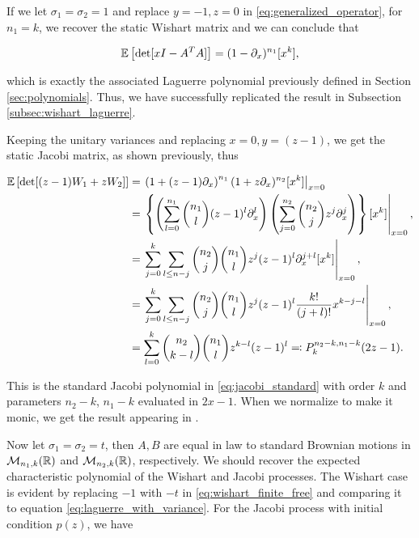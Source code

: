     If we let $\sigma_1 = \sigma_2 = 1$ and replace $y=-1, z=0$ in \eqref{eq:generalized_operator}, for $n_1 = k$, we recover the static Wishart matrix and we can conclude that

    \begin{equation} \label{eq:wishart_finite_free}
        \mathbb E \left[ \det[xI - A^TA] \right] = (1 - \partial_x)^{n_1}[x^k],
    \end{equation}

    \noindent which is exactly the associated Laguerre polynomial previously defined in Section \ref{sec:polynomials}. Thus, we have successfully replicated the result in Subsection \ref{subsec:wishart_laguerre}.

    Keeping the unitary variances and replacing $x=0, y=(z-1)$, we get the static Jacobi matrix, as shown previously, thus 

    \begin{align*}
        \mathbb E \left[ \det[(z-1)W_1 + zW_2] \right] &= \left.\left(1 + (z-1)\partial_x\right)^{n_1}(1+z\partial_x)^{n_2} [x^k]\right|_{x=0}\\
        &=\left.\left\{\left( \sum_{l=0}^{n_1} \binom {n_1}l (z-1)^l \partial_x^l \right) \left(\sum_{j=0}^{n_2} \binom {n_2}j z^j \partial_x^j \right) \right\}[x^k]\right|_{x=0},\\
        &= \left.\sum_{j=0}^k \sum_{l\le n-j} \binom{n_2}{j}\binom{n_1}l z^j (z-1)^{l} \partial_x^{j+l}[x^k]\right|_{x=0},\\
        &= \left.\sum_{j=0}^k \sum_{l\le n-j} \binom{n_2}{j}\binom{n_1}l z^j (z-1)^{l} \frac{k!}{(j+l)!}x^{k-j-l}\right|_{x=0},\\
        &= \sum_{l=0}^k \binom{n_2}{k-l} \binom{n_1}l z^{k-l}(z-1)^l \eqqcolon P_k^{n_2 - k, n_1-k}(2z-1).
    \end{align*}
    
    This is the standard Jacobi polynomial in \eqref{eq:jacobi_standard} with order $k$ and parameters $n_2 - k$, $n_1-k$ evaluated in $2x-1$. When we normalize to make it monic, we get the result appearing in \cite{edelman1988eigenvalues}.

    Now let $\sigma_1= \sigma_2 = t$, then $A,B$ are equal in law to standard Brownian motions in $\mathcal M_{n_1,k}(\mathbb R)$ and $\mathcal M_{n_2,k}(\mathbb R)$, respectively. We should recover the expected characteristic polynomial of the Wishart and Jacobi processes. The Wishart case is evident by replacing $-1$ with $-t$ in \eqref{eq:wishart_finite_free} and comparing it to equation \eqref{eq:laguerre_with_variance}. For the Jacobi process with initial condition $p(z)$, we have

